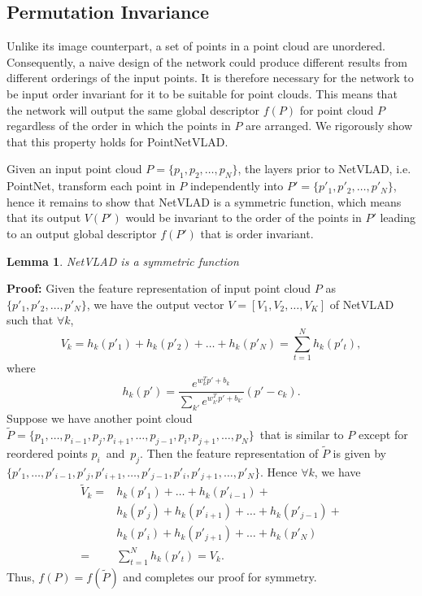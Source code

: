 \documentclass[10pt,twocolumn,letterpaper]{article}
\newtheorem{lemma}{Lemma}
\begin{document}
\subsection{Permutation Invariance}
Unlike its image counterpart, a set of points in a point cloud are unordered. Consequently, a naive design of the network could produce different results from different orderings of the input points.  
It is therefore necessary for the network to be input order invariant for it to be suitable for point clouds. This means that the network will output the same global descriptor $f(P)$ for point cloud $P$ regardless of the order in which the points in $P$ are arranged. We rigorously show that this property holds for PointNetVLAD.

Given an input point cloud $P=\{p_1,p_2,\ldots,p_N\}$, the layers prior to NetVLAD, i.e. PointNet, transform each point in $P$ independently into $P'=\{p'_1,p'_2,\ldots,p'_N\}$, hence it remains to show that NetVLAD is a symmetric function, which means that its output $V(P')$ would be invariant to the order of the points in $P'$ leading to an output global descriptor $f(P')$ that is order invariant.
\begin{lemma}
	NetVLAD is a symmetric function
\end{lemma}
\textbf{Proof:} Given the feature representation of input point cloud $P$ as $\{p'_1,p'_2,\ldots,p'_N\}$, we have the output vector $V=[V_1,V_2,\ldots,V_K]$ of NetVLAD such that $\forall k$,
\begin{equation} \label{eq2}
V_k = h_k(p'_1)+h_k(p'_2)+\ldots+h_k(p'_N)=\sum_{t=1}^{N}h_k(p'_{t}),
\end{equation}
where
\begin{equation}\label{eq3}
h_k(p')=\frac{e^{w_k^{T}p'+b_k}}{\sum_{k'}e^{w_{k'}^{T}p'+b_{k'}}}(p'-c_k).
\end{equation}
Suppose we have another point cloud $\tilde{P}=\{p_1,\ldots,p_{i-1},p_j,p_{i+1},\ldots,p_{j-1},p_{i},p_{j+1},\ldots,p_N\}$~that is similar to $P$ except for reordered points $p_i$~and~$p_j$. Then the feature representation of $\tilde{P}$ is given by $\{p'_1,\ldots,p'_{i-1},p'_j,p'_{i+1},\ldots,p'_{j-1},p'_{i},p'_{j+1},\ldots,p'_N\}$. Hence $\forall k$, we have
\begin{equation}
\begin{split}
\tilde{V}_k=&h_k(p'_1)+\ldots+h_k(p'_{i-1})+\\
&h_k(p'_{j})+h_k(p'_{i+1})+\ldots+h_k(p'_{j-1})+\\
&h_k(p'_{i})+h_k(p'_{j+1})+\ldots+h_k(p'_N)\\
=&\sum_{t=1}^{N}h_k(p'_{t}) = V_k.
\end{split}
\end{equation}
Thus, $f(P)=f(\tilde{P})$ and completes our proof for symmetry.  
\end{document}
